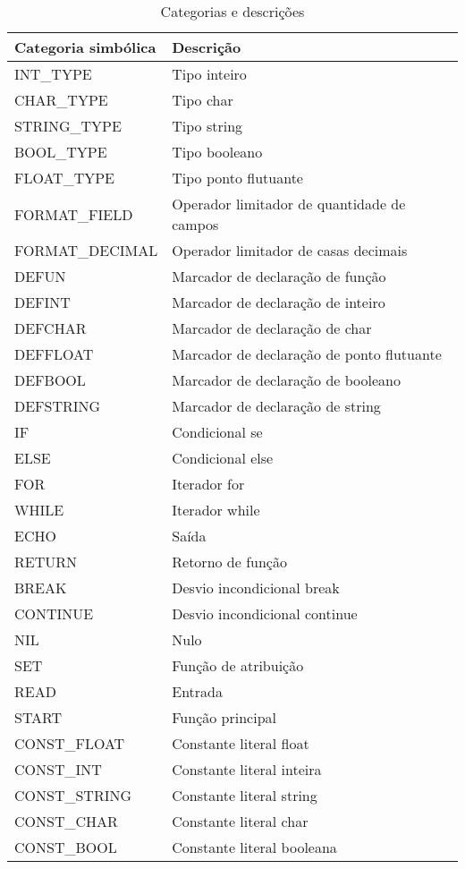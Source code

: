 \documentclass[
  12pt,				%
  oneside,			%
  a4paper,			%
  english,			%
  french,				%
  spanish,			%
  brazil,				%
]{abntex2}
\begin{document}
\begin{table}[H]
  \centering
\begin{tabular}{|l|l|}
\hline
Categoria simbólica & Descrição    \\ \hline
INT\_TYPE           & Tipo inteiro \\
CHAR\_TYPE          & Tipo char    \\
STRING\_TYPE          &   Tipo string  \\
BOOL\_TYPE          &   Tipo booleano  \\
FLOAT\_TYPE          &   Tipo ponto flutuante  \\
FORMAT\_FIELD          &   Operador limitador de quantidade de campos  \\
FORMAT\_DECIMAL          &   Operador limitador de casas decimais  \\
DEFUN          &   Marcador de declaração de função  \\
DEFINT          &   Marcador de declaração de inteiro  \\
DEFCHAR          &   Marcador de declaração de char  \\
DEFFLOAT          &   Marcador de declaração de ponto flutuante  \\
DEFBOOL           & Marcador de declaração de booleano \\
DEFSTRING           & Marcador de declaração de string \\
IF           & Condicional se \\
ELSE           & Condicional else \\
FOR           & Iterador for \\
WHILE           & Iterador while \\
ECHO           & Saída \\
RETURN           & Retorno de função \\
BREAK           & Desvio incondicional break \\
CONTINUE           & Desvio incondicional continue \\
NIL           & Nulo \\
SET           & Função de atribuição \\
READ           & Entrada \\
START           & Função principal \\
CONST\_FLOAT           & Constante literal float \\
CONST\_INT           & Constante literal inteira \\
CONST\_STRING           & Constante literal string \\
CONST\_CHAR           & Constante literal char \\
CONST\_BOOL           & Constante literal booleana \\ \hline
\end{tabular}
\caption{Categorias e descrições}
\label{tab:cat-desc1}
\end{table}
\end{document}
